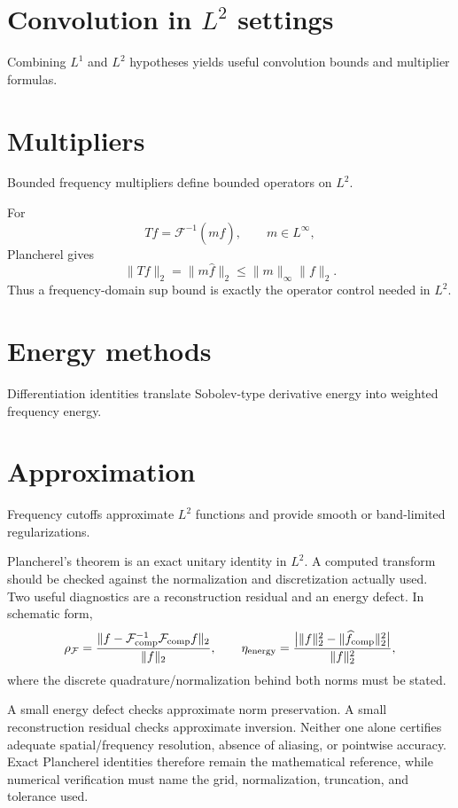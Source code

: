 \section{Convolution in $L^2$ settings}
Combining $L^1$ and $L^2$ hypotheses yields useful convolution bounds and multiplier formulas.

\section{Multipliers}
Bounded frequency multipliers define bounded operators on $L^2$.


\begin{example}\label{ex:iii13-expand-02}
For
\[
Tf=\mathcal F^{-1}(m\widehat f),\qquad m\in L^\infty,
\]
Plancherel gives
\[
\|Tf\|_2=\|m\widehat f\|_2
\le\|m\|_\infty\|f\|_2.
\]
Thus a frequency-domain sup bound is exactly the operator control needed in
\(L^2\).
\end{example}
\section{Energy methods}
Differentiation identities translate Sobolev-type derivative energy into weighted frequency energy.

\section{Approximation}
Frequency cutoffs approximate $L^2$ functions and provide smooth or band-limited regularizations.

\begin{remark}
Plancherel's theorem is an exact unitary identity in \(L^2\).  A computed
transform should be checked against the normalization and discretization
actually used.  Two useful diagnostics are a reconstruction residual and an
energy defect.  In schematic form,
\[
\rho_{\mathcal F}
=
\frac{\|f-\mathcal F^{-1}_{\rm comp}\mathcal F_{\rm comp}f\|_2}{\|f\|_2},
\qquad
\eta_{\rm energy}
=
\frac{\bigl|\|f\|_2^2-\|\widehat f_{\rm comp}\|_2^2\bigr|}{\|f\|_2^2},
\]
where the discrete quadrature/normalization behind both norms must be stated.

A small energy defect checks approximate norm preservation.  A small
reconstruction residual checks approximate inversion.  Neither one alone
certifies adequate spatial/frequency resolution, absence of aliasing, or
pointwise accuracy.  Exact Plancherel identities therefore remain the
mathematical reference, while numerical verification must name the grid,
normalization, truncation, and tolerance used.
\end{remark}



